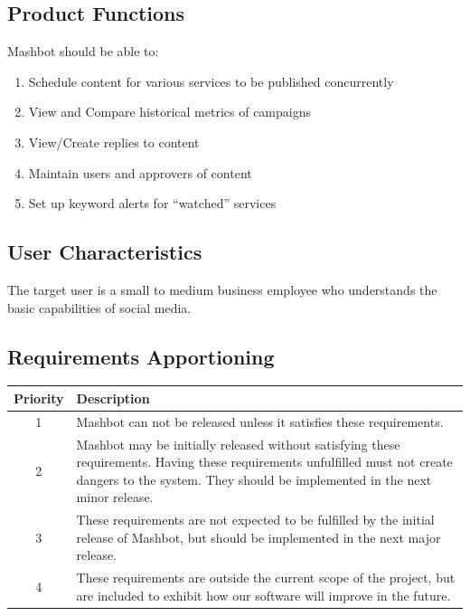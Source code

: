 \documentclass{report}
\begin{document}
	\subsection{Product Functions} %
        Mashbot should be able to:
        \begin{enumerate}
          \item Schedule content for various services to be
            published concurrently
          \item View and Compare historical metrics of campaigns
          \item View/Create replies to content
          \item Maintain users and approvers of content
          \item Set up keyword alerts for ``watched'' services
        \end{enumerate}
	\subsection{User Characteristics} %
        The target user is a small to medium business employee who understands
        the basic capabilities of social media.
        
	\subsection{Requirements Apportioning} %
        \begin{tabular}{|c|p{4in}|}
          \hline
          \textbf{Priority} & \textbf{Description} \\
          \hline \hline
          1 & Mashbot can not be released unless it satisfies these
              requirements. \\
          \hline
          2 & Mashbot may be initially released without satisfying these
              requirements. Having these requirements unfulfilled must
              not create dangers to the system. They should be implemented in the next
              minor release. \\
          \hline
          3 & These requirements are not expected to be fulfilled by
              the initial release of Mashbot, but should be
              implemented in the next major release. \\
          \hline
          4 & These requirements are outside the current scope of the
              project, but are included to exhibit how our software
              will improve in the future. \\
          \hline
        \end{tabular}
\end{document}
